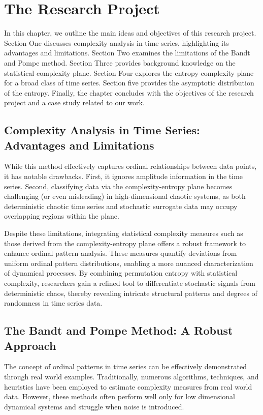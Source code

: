 \chapter{The Research Project}\label{C:aim}

In this chapter, we outline the main ideas and objectives of this research project. Section One discusses complexity analysis in time series, highlighting its advantages and limitations. Section Two examines the limitations of the Bandt and Pompe method. Section Three provides background knowledge on the statistical complexity plane. Section Four explores the entropy-complexity plane for a broad class of time series. Section five provides the asymptotic distribution of the entropy. Finally, the chapter concludes with the objectives of the research project and a case study related to our work.

\section*{Complexity Analysis in Time Series: Advantages and Limitations}

While this method effectively captures ordinal relationships between data points, it has notable drawbacks. First, it ignores amplitude information in the time series. Second, classifying data via the complexity-entropy plane becomes challenging (or even misleading) in high-dimensional chaotic systems, as both deterministic chaotic time series and stochastic surrogate data may occupy overlapping regions within the plane.

Despite these limitations, integrating statistical complexity measures such as those derived from the complexity-entropy plane offers a robust framework to enhance ordinal pattern analysis. These measures quantify deviations from uniform ordinal pattern distributions, enabling a more nuanced characterization of dynamical processes. By combining permutation entropy with statistical complexity, researchers gain a refined tool to differentiate stochastic signals from deterministic chaos, thereby revealing intricate structural patterns and degrees of randomness in time series data.

\section*{The Bandt and Pompe Method: A Robust Approach}

The concept of ordinal patterns in time series can be effectively demonstrated through real world examples. Traditionally, numerous algorithms, techniques, and heuristics have been employed to estimate complexity measures from real world data. However, these methods often perform well only for low dimensional dynamical systems and struggle when noise is introduced.

